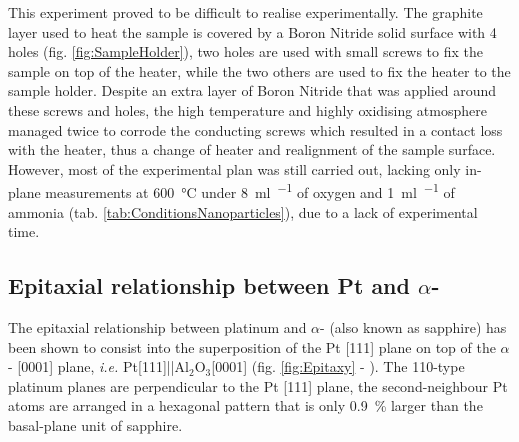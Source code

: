 
This experiment proved to be difficult to realise experimentally.
The graphite layer used to heat the sample is covered by a Boron Nitride solid surface with 4 holes (fig. \ref{fig:SampleHolder}), two holes are used with small screws to fix the sample on top of the heater, while the two others are used to fix the heater to the sample holder.
Despite an extra layer of Boron Nitride that was applied around these screws and holes, the high temperature and highly oxidising atmosphere managed twice to corrode the conducting screws which resulted in a contact loss with the heater, thus a change of heater and realignment of the sample surface.
However, most of the experimental plan was still carried out, lacking only in-plane measurements at \qty{600}{\degreeCelsius} under \qty{8}{\ml\per\min} of oxygen and \qty{1}{\ml\per\min} of ammonia (tab. \ref{tab:ConditionsNanoparticles}), due to a lack of experimental time.

\subsection{Epitaxial relationship between Pt and $\alpha$-}

The epitaxial relationship between platinum and $\alpha$- (also known as sapphire) has been shown to consist into the superposition of the Pt [111] plane on top of the $\alpha$- [0001] plane, \textit{i.e.} Pt[111]||Al$_2$O$_3$[0001] (fig. \ref{fig:Epitaxy} - \cite{Farrow1993}).
The {110}-type platinum planes are perpendicular to the Pt [111] plane, the second-neighbour Pt atoms are arranged in a hexagonal pattern that is only \qty{0.9}{\percent} larger than the basal-plane unit of sapphire.

